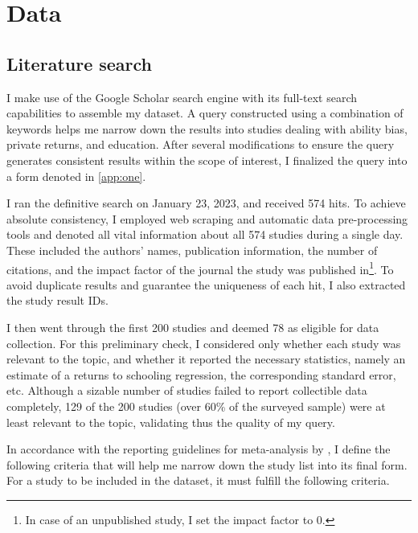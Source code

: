 \chapter{Data}
\label{chap:three}

\section{Literature search}
\label{sec:literature_search}

I make use of the Google Scholar search engine with its full-text search capabilities to assemble my dataset. A query constructed using a combination of keywords helps me narrow down the results into studies dealing with ability bias, private returns, and education. After several modifications to ensure the query generates consistent results within the scope of interest, I finalized the query into a form denoted in \autoref{app:one}.

I ran the definitive search on January 23, 2023, and received 574 hits. To achieve absolute consistency, I employed web scraping and automatic data pre-processing tools and denoted all vital information about all 574 studies during a single day. These included the authors' names, publication information, the number of citations, and the impact factor of the journal the study was published in\footnote{In case of an unpublished study, I set the impact factor to 0.}. To avoid duplicate results and guarantee the uniqueness of each hit, I also extracted the study result IDs.

I then went through the first 200 studies and deemed 78 as eligible for data collection. For this preliminary check, I considered only whether each study was relevant to the topic, and whether it reported the necessary statistics, namely an estimate of a returns to schooling regression, the corresponding standard error, etc.
Although a sizable number of studies failed to report collectible data completely, 129 of the 200 studies (over 60\% of the surveyed sample) were at least relevant to the topic, validating thus the quality of my query.

In accordance with the reporting guidelines for meta-analysis by \cite{havranek2020guidelines}, I define the following criteria that will help me narrow down the study list into its final form. For a study to be included in the dataset, it must fulfill the following criteria.

